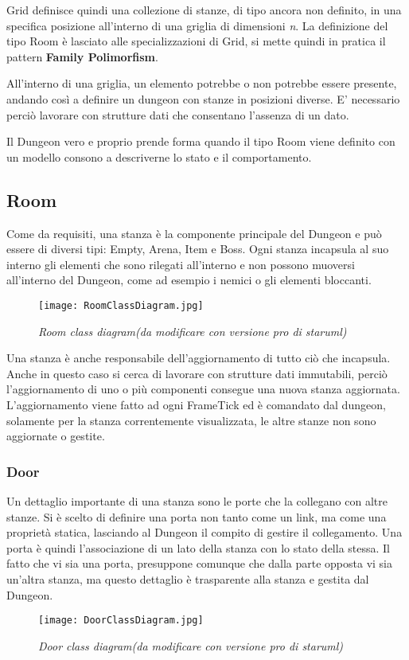 Grid definisce quindi una collezione di stanze, di tipo ancora non definito, in una specifica posizione all'interno di una griglia di dimensioni \textit{n}. La definizione del tipo Room è lasciato alle specializzazioni di Grid, si mette quindi in pratica il pattern \textbf{Family Polimorfism}.

All'interno di una griglia, un elemento potrebbe o non potrebbe essere presente, andando così a definire un dungeon con stanze in posizioni diverse. 
E' necessario perciò lavorare con strutture dati che consentano l'assenza di un dato.

Il Dungeon vero e proprio prende forma quando il tipo Room viene definito con un modello consono a descriverne lo stato e il comportamento. 

\subsection{Room}
Come da requisiti, una stanza è la componente principale del Dungeon e può essere di diversi tipi: Empty, Arena, Item e Boss. 
Ogni stanza incapsula al suo interno gli elementi che sono rilegati all'interno e non possono muoversi all'interno del Dungeon, come ad esempio i nemici o gli elementi bloccanti. 

\begin{figure}[!hbt]
    \centering
    \texttt{[image: RoomClassDiagram.jpg]}
    \caption{\textit{Room class diagram(da modificare con versione pro di staruml)}} 
\end{figure}

Una stanza è anche responsabile dell'aggiornamento di tutto ciò che incapsula. Anche in questo caso si cerca di lavorare con strutture dati immutabili, perciò l'aggiornamento di uno o più componenti consegue una nuova stanza aggiornata. 
L'aggiornamento viene fatto ad ogni FrameTick ed è comandato dal dungeon, solamente per la stanza correntemente visualizzata, le altre stanze non sono aggiornate o gestite.  

\subsubsection{Door}
Un dettaglio importante di una stanza sono le porte che la collegano con altre stanze. Si è scelto di definire una porta non tanto come un link, ma come una proprietà statica, lasciando al Dungeon il compito di gestire il collegamento. 
Una porta è quindi l'associazione di un lato della stanza con lo stato della stessa. Il fatto che vi sia una porta, presuppone comunque che dalla parte opposta vi sia un'altra stanza, ma questo dettaglio è trasparente alla stanza e gestita dal Dungeon. 
\begin{figure}[!hbt]
    \centering
    \texttt{[image: DoorClassDiagram.jpg]}
    \caption{\textit{Door class diagram(da modificare con versione pro di staruml)}} 
\end{figure}

